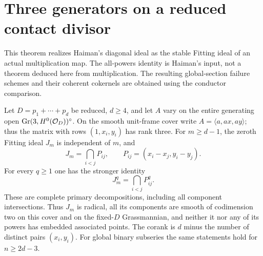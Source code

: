 \section{Three generators on a reduced contact divisor}
\label{sec:three-generators}
This theorem realizes Haiman's diagonal ideal as the stable Fitting
ideal of an actual multiplication map. The all-powers identity is
Haiman's input, not a theorem deduced here from multiplication.
The resulting global-section failure schemes and their coherent
cokernels are obtained using the conductor comparison.



\begin{theorem}
\label{thm:three-plane-primary}
Let $D=p_1+\cdots+p_d$ be reduced, $d\ge4$, and let $A$ vary on
the entire generating open $\operatorname{Gr}(3,H^0(\mathcal O_D))^\circ$.
On the smooth unit-frame cover write $A=\langle a,ax,ay\rangle$;
thus the matrix with rows $(1,x_i,y_i)$ has rank three. For $m\ge d-1$,
the zeroth Fitting ideal $J_m$ is independent of $m$, and
\begin{equation}\label{eq:three-plane-primary}
 J_m=\bigcap_{i<j}P_{ij},\qquad P_{ij}=(x_i-x_j,y_i-y_j).
\end{equation}
For every $q\ge1$ one has the stronger identity
\begin{equation}\label{eq:three-plane-powers}
 J_m^q=\bigcap_{i<j}P_{ij}^q.
\end{equation}
These are complete primary decompositions, including all component
intersections. Thus $J_m$ is radical, all its components are smooth
of codimension two on this cover and on the fixed-$D$ Grassmannian,
and neither it nor any of its powers has embedded associated points.
The corank is $d$ minus the number of distinct pairs $(x_i,y_i)$.
For global binary subseries the same statements hold for $n\ge2d-3$.
\end{theorem}
